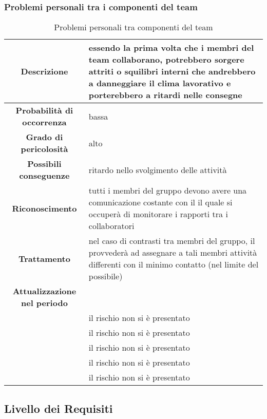 \documentclass[PianoDiProgetto.tex]{subfiles}
\begin{document}
		\subsubsection{Problemi personali tra i componenti del team}
			\label{sec:pptc}
\begin{table}[h]
		\begin{center}
			\begin{tabular}{ | c | p{10cm} |}
				\hline


		 \textbf{Descrizione} & essendo la prima volta che i membri del team collaborano, potrebbero sorgere attriti o squilibri interni che andrebbero a danneggiare il clima lavorativo e porterebbero a ritardi nelle consegne \\ \hline
		 \textbf{Probabilità di occorrenza} & bassa \\ \hline
		 \textbf{Grado di pericolosità} & alto \\ \hline
		 \textbf{Possibili conseguenze} & ritardo nello svolgimento delle attività \\ \hline
		 \textbf{Riconoscimento} & tutti i membri del gruppo devono avere una comunicazione costante con il \RESP{} il quale si occuperà di monitorare i rapporti tra i collaboratori \\ \hline
		 \textbf{Trattamento} & nel caso di contrasti tra membri del gruppo, il \RESP{} provvederà ad assegnare a tali membri attività differenti con il minimo contatto (nel limite del possibile) \\ \hline
		 \textbf{Attualizzazione nel periodo} &

				\\ \hline \textbf{\PerAR} & il rischio non si è presentato
				\\ \hline \textbf{\PerAD}& il rischio non si è presentato
				\\ \hline \textbf{\PerPA}& il rischio non si è presentato
				\\ \hline \textbf{\PerPD}& il rischio non si è presentato
				\\ \hline \textbf{\PerC}& il rischio non si è presentato \\
		 \hline

\end{tabular}
		\caption{Problemi personali tra componenti del team}
		\end{center}
	\end{table}

\clearpage
	\subsection{Livello dei Requisiti}
\end{document}
